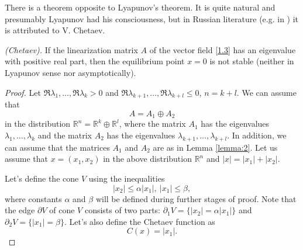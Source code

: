 There is a theorem opposite to Lyapunov's theorem. It is quite natural and presumably Lyapunov had his consciousness, but in Russian literature (e.g. in \cite{Fil}) it is attributed to V. Chetaev.

\begin{theorem}\emph{(Chetaev).}
	If the linearization matrix $A$ of the vector field \eqref{1.3} has an eigenvalue with positive real part, then the equilibrium point $x = 0$ is not stable (neither in Lyapunov sense nor asymptotically).
	\begin{proof}
		Let $\Re \lambda_1,\ldots, \Re \lambda_k > 0$ and $\Re \lambda_{k+1}, \ldots, \Re \lambda_{k+l} \leq 0$, $n = k+l$. We can assume that
		$$A = A_1 \oplus A_2$$
		in the distribution $\mathbb{R}^n = \mathbb{R}^k \oplus \mathbb{R}^l$, where the matrix $A_1$ has the eigenvalues $\lambda_1,\ldots, \lambda_k$ and the matrix $A_2$ has the eigenvalues $\lambda_{k+1}, \ldots, \lambda_{k+l}$. In addition, we can assume that the matrices $A_1$ and $A_2$ are as in Lemma \ref{lemma:2}. Let us assume that $x = (x_1, x_2)$ in the above distribution $\mathbb{R}^n$ and $\left|x\right| = \left|x_1\right| + \left|x_2\right|$.
		
		Let's define the cone $V$ using the inequalities
		$$\left|x_2\right| \leq \alpha\left|x_1\right|,\ \left|x_1\right| \leq \beta,$$
		where constants $\alpha$ and $\beta$ will be defined during further stages of proof. Note that the edge $\partial V$ of cone $V$ consists of two parts: $\partial_1 V = \{\left|x_2\right| = \alpha \left|x_1\right|\}$ and $\partial_2 V = \{\left|x_1\right| = \beta\}$.
		Let's also define the Chetaev  function as
		$$C(x) = \left|x_1\right|.$$
		

\end{proof}
\end{theorem}
